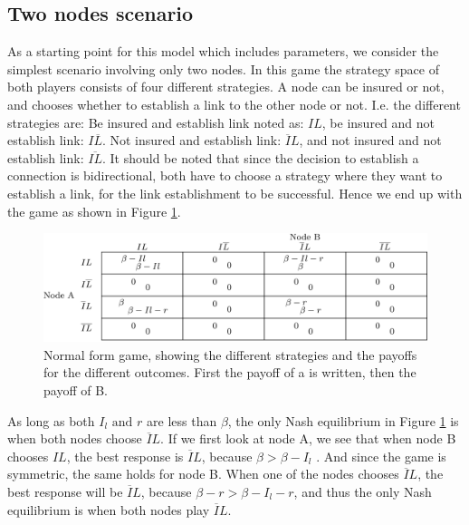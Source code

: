 \subsection{Two nodes scenario}
As a starting point for this model which includes parameters, we consider the simplest scenario involving only two nodes. In this game the strategy space of both players consists of four different strategies. A node can be insured or not, and chooses whether to establish a link to the other node or not. I.e. the different strategies are: Be insured and establish link noted as: $IL$, 
be insured and not establish link: $I\overline{L}$. Not insured and establish link: $\overline{I}L$, and not insured and not establish link: $\overline{IL}$. It should be noted that since the decision to establish a connection is bidirectional, both have to choose a strategy where they want to establish a link, for the link establishment to be successful. Hence we end up with the game as shown in Figure \ref{fig:FirstGameTheoryModel}.

\begin{figure} 
\centering
\includegraphics[width=1.0\textwidth]{../Figures/FirstGameWithParameters.png}
\caption{\label{fig:FirstGameTheoryModel} Normal form game, showing the different strategies and the payoffs  for the different outcomes. First the payoff of a is written, then the payoff of B.}
\end{figure}

As long as both $I_{l} \text{ and } r$ are less than $\beta$, the only Nash equilibrium in Figure \ref{fig:FirstGameTheoryModel} is when both nodes choose $\overline{I}L$. If we first look at node A, we see that when node B chooses $IL$, the best response is $\overline{I}L$, because $ \beta >\beta- I_{l}$ . And since the game is symmetric, the same holds for node B. 
When one of the nodes chooses $\overline{I}L$, the best response will be $\overline{I}L$, because $\beta - r>\beta - I_{l} - r  $, and thus the only Nash equilibrium is when both nodes play $\overline{I}L$.

